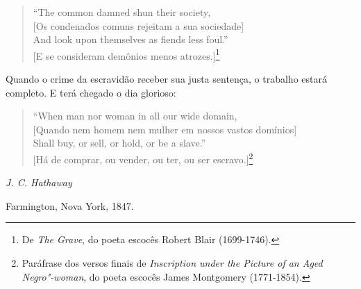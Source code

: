 \begin{verse}
``The common damned shun their society,\\
{[}Os condenados comuns rejeitam a sua \qb{}sociedade{]}\\
And look upon themselves as fiends less foul.''\\
{[}E se consideram demônios menos atrozes.{]}\footnote{De \emph{The Grave}, do poeta
  escocês Robert Blair (1699-1746).}
\end{verse}

Quando o crime da escravidão receber sua justa sentença, o trabalho
estará completo. E terá chegado o dia glorioso:

\begin{verse}
``When man nor woman in all our wide \qb{}domain,\\
{[}Quando nem homem nem mulher em \qb{}nossos vastos domínios{]}\\
Shall buy, or sell, or hold, or be a slave.''\\
{[}Há de comprar, ou vender, ou ter, ou ser \qb{}escravo.{]}\footnote{Paráfrase dos versos finais
  de \emph{Inscription under the Picture of an Aged Negro"-woman}, do
  poeta escocês James Montgomery (1771-1854).}
\end{verse}

\begin{flushright}
\emph{J. C. Hathaway}

Farmington, Nova York, 1847.
\end{flushright}

\pagebreak

